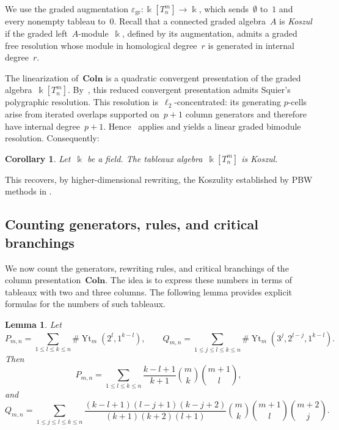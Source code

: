 \documentclass[a4paper, twoside, 11pt, english]{article}
\theoremstyle{plain}
\newtheorem{lemma}[subsubsection]{Lemma}
\newtheorem{corollary}[subsubsection]{Corollary}
\theoremstyle{definition}
\DeclareMathOperator{\YoungT}{Yt}
\renewcommand{\epsilon}{\varepsilon}
\newcommand{\Colo}{\mathbf{Coln}}
\begin{document}
We use the graded augmentation
$\epsilon_{\mathrm{gr}}:\Bbbk[T_n^m]\to\Bbbk$,
which sends~$\emptyset$ to~$1$ and every nonempty tableau to~$0$.
Recall that a connected graded algebra~$A$ is \emph{Koszul}
if the graded left~$A$-module~$\Bbbk$, defined by its
augmentation, admits a graded free resolution whose module
in homological degree~$r$ is generated in internal degree~$r$.

The linearization of~$\Colo$ is a quadratic convergent presentation of
the graded algebra~$\Bbbk[T_n^m]$.
By~\cite[Theorem~6.2.4]{GuiraudHoffbeckMalbos19}, this reduced
convergent presentation admits Squier's polygraphic
resolution. This resolution is~$\ell_2$-concentrated:
its generating $p$-cells arise from iterated overlaps
supported on~$p+1$ column generators and therefore have
internal degree~$p+1$.
 Hence~\cite[Proposition~7.2.2]{GuiraudHoffbeckMalbos19} applies and yields a
linear graded bimodule resolution. Consequently:

\begin{corollary}
\label{cor:Koszul}
Let~$\Bbbk$ be a field. The tableaux algebra~$\Bbbk[T_n^m]$ is Koszul.
\end{corollary}

This recovers, by higher-dimensional rewriting, the Koszulity established
by PBW methods in
\cite[Corollary~2.14]{DaughertyGonzalezMunizOcalPanTorres25}.




\subsection{Counting generators, rules, and critical branchings}
We now count the generators, rewriting rules, and critical branchings of the
column presentation~$\Colo$.
The idea is to express these numbers in terms of tableaux with two and three
columns.
The following lemma provides explicit formulas for the numbers of such tableaux.

\begin{lemma}
\label{lem:PmnnQmnn}
Let
\[\displaystyle 
P_{m,n}
=
\sum_{1\le l\le k\le n}\#\YoungT_m(2^l,1^{k-l}),
\qquad
Q_{m,n}
=
\sum_{1\le j\le l\le k\le n}\#\YoungT_m(3^j,2^{l-j},1^{k-l}).
\]
Then
\[\displaystyle 
P_{m,n}
=
\sum_{1\le l\le k\le n}
\frac{k-l+1}{k+1}\binom{m}{k}\binom{m+1}{l},
\]
and
\[\displaystyle 
Q_{m,n}
=
\sum_{1\le j\le l\le k\le n}
\frac{(k-l+1)(l-j+1)(k-j+2)}
{(k+1)(k+2)(l+1)}
\binom{m}{k}\binom{m+1}{l}\binom{m+2}{j}.
\]
\end{lemma}
\end{document}
